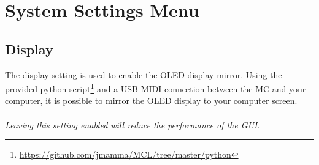 \chapter{System Settings Menu}

\section{Display}
The display setting is used to enable the OLED display mirror. Using the provided python script\footnote{\url{https://github.com/jmamma/MCL/tree/master/python}} and a USB MIDI connection between the MC and your computer, it is possible to mirror the OLED display to your computer screen.\\
\\
\textit{Leaving this setting enabled will reduce the performance of the GUI.}

